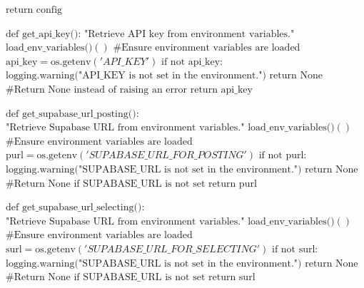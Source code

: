 \begin{algorithmic}[1]
	\STATE \hspace{0.5cm} $\text{return config}$
	
	\STATE
	\STATE $\text{def get\_api\_key():}$
	\STATE \hspace{0.5cm} $\text{"Retrieve API key from environment variables."}$
	\STATE \hspace{0.5cm} $\text{load\_env\_variables()}()$ $\text{\# Ensure environment variables are loaded}$
	\STATE \hspace{0.5cm} $\text{api\_key} = \text{os.getenv}('API\_KEY')$
	\STATE \hspace{0.5cm} $\text{if not api\_key:}$
	\STATE \hspace{1.0cm} $\text{logging.warning("API\_KEY is not set in the environment.")}$
	\STATE \hspace{1.0cm} $\text{return None}$ $\text{\# Return None instead of raising an error}$
	\STATE \hspace{0.5cm} $\text{return api\_key}$
	
	\STATE
	\STATE $\text{def get\_supabase\_url\_posting():}$
	\STATE \hspace{0.5cm} $\text{"Retrieve Supabase URL from environment variables."}$
	\STATE \hspace{0.5cm} $\text{load\_env\_variables()}()$ $\text{\# Ensure environment variables are loaded}$
	\STATE \hspace{0.5cm} $\text{purl} = \text{os.getenv}('SUPABASE\_URL\_FOR\_POSTING')$
	\STATE \hspace{0.5cm} $\text{if not purl:}$
	\STATE \hspace{1.0cm} $\text{logging.warning("SUPABASE\_URL is not set in the environment.")}$
	\STATE \hspace{1.0cm} $\text{return None}$ $\text{\# Return None if SUPABASE\_URL is not set}$
	\STATE \hspace{0.5cm} $\text{return purl}$
	
	\STATE
	\STATE $\text{def get\_supabase\_url\_selecting():}$
	\STATE \hspace{0.5cm} $\text{"Retrieve Supabase URL from environment variables."}$
	\STATE \hspace{0.5cm} $\text{load\_env\_variables()}()$ $\text{\# Ensure environment variables are loaded}$
	\STATE \hspace{0.5cm} $\text{surl} = \text{os.getenv}('SUPABASE\_URL\_FOR\_SELECTING')$
	\STATE \hspace{0.5cm} $\text{if not surl:}$
	\STATE \hspace{1.0cm} $\text{logging.warning("SUPABASE\_URL is not set in the environment.")}$
	\STATE \hspace{1.0cm} $\text{return None}$ $\text{\# Return None if SUPABASE\_URL is not set}$
	\STATE \hspace{0.5cm} $\text{return surl}$
\end{algorithmic}

